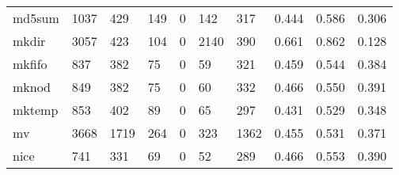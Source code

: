 \begin{longtable}{lp{2.0cm}p{2.0cm}p{2.0cm}p{2.0cm}p{2.0cm}p{2.0cm}p{2.0cm}p{2.0cm}p{2.0cm}}
md5sum    &                   1037 &                                429 &                               149 &                                0 &                               142 &                             317 &                                0.444 &                                  0.586 &                                0.306 \\
mkdir     &                   3057 &                                423 &                               104 &                                0 &                              2140 &                             390 &                                0.661 &                                  0.862 &                                0.128 \\
mkfifo    &                    837 &                                382 &                                75 &                                0 &                                59 &                             321 &                                0.459 &                                  0.544 &                                0.384 \\
mknod     &                    849 &                                382 &                                75 &                                0 &                                60 &                             332 &                                0.466 &                                  0.550 &                                0.391 \\
mktemp    &                    853 &                                402 &                                89 &                                0 &                                65 &                             297 &                                0.431 &                                  0.529 &                                0.348 \\
mv        &                   3668 &                               1719 &                               264 &                                0 &                               323 &                            1362 &                                0.455 &                                  0.531 &                                0.371 \\
nice      &                    741 &                                331 &                                69 &                                0 &                                52 &                             289 &                                0.466 &                                  0.553 &                                0.390 \\

\end{longtable}
